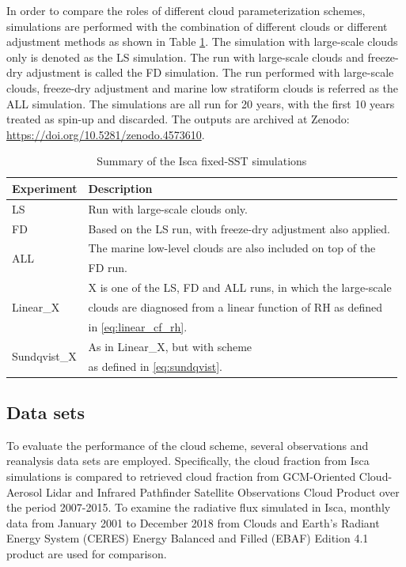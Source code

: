 In order to compare the roles of different cloud parameterization schemes, simulations are performed with the combination of different clouds or different adjustment methods as shown in Table \ref{tab:exps}. The simulation with large-scale clouds only is denoted as the LS simulation. The run with large-scale clouds and freeze-dry adjustment is called the FD simulation. The run performed with large-scale clouds, freeze-dry adjustment and marine low stratiform clouds is referred as the ALL simulation. The simulations are all run for 20 years, with the first 10 years treated as spin-up and discarded. The outputs are archived at Zenodo: \url{https://doi.org/10.5281/zenodo.4573610}.

\begin{table}
	\caption{Summary of the Isca fixed-SST simulations}
	\vspace{0.5em}
	\centering
	\renewcommand{\arraystretch}{1.3}
	\begin{tabular}{ll}
		\toprule
		Experiment & Description \\
		\midrule
		LS  & Run with large-scale clouds only. \\ 
		FD  & Based on the LS run, with freeze-dry adjustment also applied. \\ 
		\multirow{2}{*}{ALL} & The marine low-level clouds are also included on top of the \\
		    & FD run.  \\
		\multirow{3}{*}{Linear\_X} 	&  X is one of the LS, FD and ALL runs, in which the large-scale \\
		& clouds are diagnosed from a linear function of RH as defined\\
		& in \eqref{eq:linear_cf_rh}. \\
		\multirow{2}{*}{Sundqvist\_X} & As in Linear\_X, but with \citet{Sundqvist1989} scheme\\ 
		& as defined in \eqref{eq:sundqvist}.\\
		\bottomrule
	\end{tabular}
	\label{tab:exps}
\end{table}

\subsection{Data sets}
To evaluate the performance of the cloud scheme, several observations and reanalysis data sets are employed. Specifically, the cloud fraction from Isca simulations is compared to retrieved cloud fraction from GCM-Oriented Cloud-Aerosol Lidar and Infrared Pathfinder Satellite Observations Cloud Product \citep[CALIPSO-GOCCP hereafter;][]{Chepfer2010} over the period 2007-2015. To examine the radiative flux simulated in Isca, monthly data from January 2001 to December 2018 from Clouds and Earth's Radiant Energy System (CERES)  Energy Balanced and Filled (EBAF) Edition 4.1 product \citep[CERES-EBAF hereafter;][]{Loeb2018} are used for comparison.

